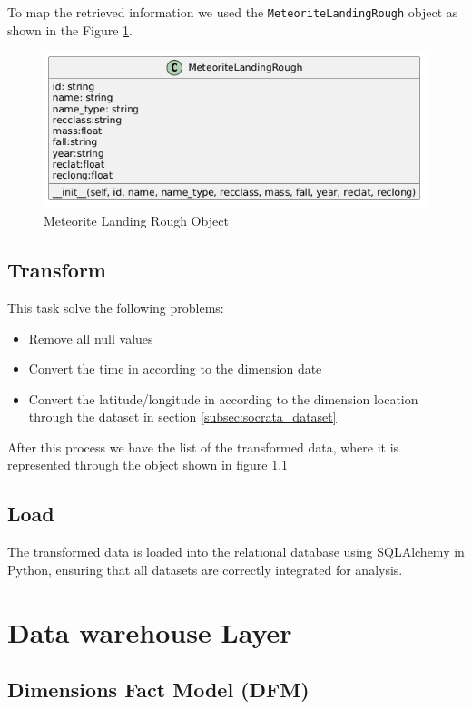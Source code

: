 \documentclass[conference]{IEEEtran}
\begin{document}
	To map the retrieved information we used the \texttt{MeteoriteLandingRough} object as shown in the Figure \ref{fig:MeteoriteLandingRough}.
	\begin{figure}[htpb]
		\centering
		\includegraphics[width=\columnwidth]{images/meteorite_landing_rough_obj.png}
		\caption{Meteorite Landing Rough Object}
		\label{fig:MeteoriteLandingRough}
	\end{figure}
	
	\subsection{Transform}
	This task solve the following problems:
	\begin{itemize}
		\item Remove all null values
		\item Convert the time in according to the dimension date
		\item Convert the latitude/longitude in according to the dimension location through the dataset in section \ref{subsec:socrata_dataset}
	\end{itemize}
	After this process we have the list of the transformed data, where it is represented through the object shown in figure \ref{}
	
	\subsection{Load}
	The transformed data is loaded into the relational database using SQLAlchemy in Python, ensuring that all datasets are correctly integrated for analysis.
	
	\section{Data warehouse Layer}
	
	\subsection{Dimensions Fact Model (DFM)}
	
\end{document}
